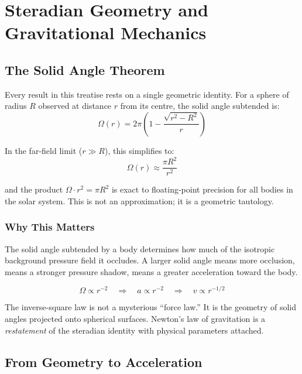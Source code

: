 \chapter{Steradian Geometry and Gravitational Mechanics}
\label{ch:steradian-geometry}


\section{The Solid Angle Theorem}

Every result in this treatise rests on a single geometric identity. For a sphere of radius $R$ observed at distance $r$ from its centre, the solid angle subtended is:
\begin{equation}\label{eq:omega-exact}
  \Omega(r) = 2\pi\left(1 - \frac{\sqrt{r^2 - R^2}}{r}\right)
\end{equation}

In the far-field limit ($r \gg R$), this simplifies to:
\begin{equation}\label{eq:omega-ff}
  \Omega(r) \approx \frac{\pi R^2}{r^2}
\end{equation}

and the product $\Omega \cdot r^2 = \pi R^2$ is exact to floating-point precision for all bodies in the solar system. This is not an approximation; it is a geometric tautology.

\subsection{Why This Matters}

The solid angle subtended by a body determines how much of the isotropic background pressure field it occludes. A larger solid angle means more occlusion, means a stronger pressure shadow, means a greater acceleration toward the body.

\begin{equation}
  \Omega \propto r^{-2} \quad\Rightarrow\quad a \propto r^{-2} \quad\Rightarrow\quad v \propto r^{-1/2}
\end{equation}

The inverse-square law is not a mysterious ``force law.'' It is the geometry of solid angles projected onto spherical surfaces. Newton's law of gravitation is a \emph{restatement} of the steradian identity with physical parameters attached.


\section{From Geometry to Acceleration}

